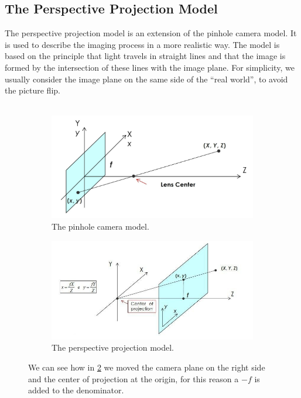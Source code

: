 \subsection{The Perspective Projection Model}
The perspective projection model is an extension of the pinhole camera model. It is used to describe the imaging process in a more realistic way. The model is based on the principle that light travels in straight lines and that the image is formed by the intersection of these lines with the image plane. 
For simplicity, we usually consider the image plane on the same side of the “real world”, to avoid the picture flip.\\\\
\begin{figure}[H]
    \begin{subfigure}{0.5\textwidth}
        \includegraphics[scale=0.2]{Figures/Perspective_proj1.jpeg}
        \caption{The pinhole camera model.} 
        \label{fig:subim1}
    \end{subfigure}
    \begin{subfigure}{0.5\textwidth}
        \includegraphics[scale=0.4]{Figures/Perspective_proj.jpeg}
        \caption{The perspective projection model.}
        \label{fig:subim2}
    \end{subfigure}
    \caption{We can see how in \ref{fig:subim2} we moved the camera plane on the right side and the center of projection at the origin, for this reason a $-f$ is added to the denominator.}
        \label{fig:image2}
\end{figure}


